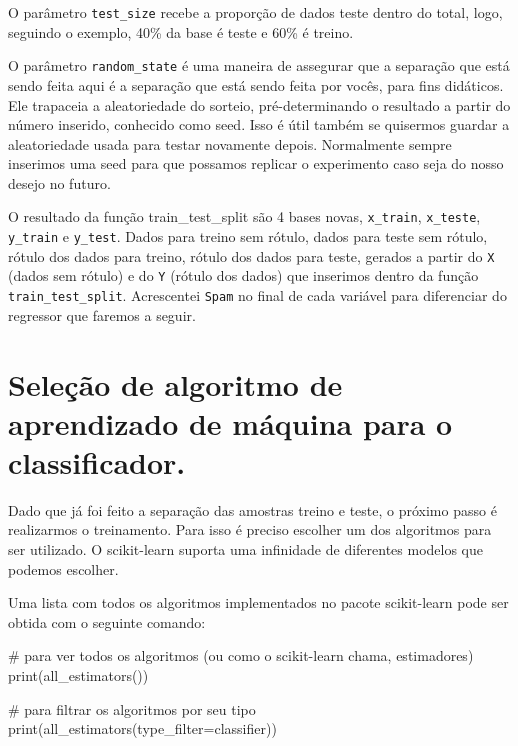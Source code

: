\documentclass[
  letterpaper,
  DIV=11,
  numbers=noendperiod]{scrreprt}
\newenvironment{Shaded}{\begin{snugshade}}{\end{snugshade}}
\newcommand{\BuiltInTok}[1]{\textcolor[rgb]{0.00,0.23,0.31}{#1}}
\newcommand{\CommentTok}[1]{\textcolor[rgb]{0.37,0.37,0.37}{#1}}
\newcommand{\NormalTok}[1]{\textcolor[rgb]{0.00,0.23,0.31}{#1}}
\newcommand{\OperatorTok}[1]{\textcolor[rgb]{0.37,0.37,0.37}{#1}}
\newcommand{\StringTok}[1]{\textcolor[rgb]{0.13,0.47,0.30}{#1}}
\begin{document}
O parâmetro \texttt{test\_size} recebe a proporção de dados teste dentro
do total, logo, seguindo o exemplo, 40\% da base é teste e 60\% é
treino.

O parâmetro \texttt{random\_state} é uma maneira de assegurar que a
separação que está sendo feita aqui é a separação que está sendo feita
por vocês, para fins didáticos. Ele trapaceia a aleatoriedade do
sorteio, pré-determinando o resultado a partir do número inserido,
conhecido como seed. Isso é útil também se quisermos guardar a
aleatoriedade usada para testar novamente depois. Normalmente sempre
inserimos uma seed para que possamos replicar o experimento caso seja do
nosso desejo no futuro.

O resultado da função train\_test\_split são 4 bases novas,
\texttt{x\_train}, \texttt{x\_teste}, \texttt{y\_train} e
\texttt{y\_test}. Dados para treino sem rótulo, dados para teste sem
rótulo, rótulo dos dados para treino, rótulo dos dados para teste,
gerados a partir do \texttt{X} (dados sem rótulo) e do \texttt{Y}
(rótulo dos dados) que inserimos dentro da função
\texttt{train\_test\_split}. Acrescentei \texttt{Spam} no final de cada
variável para diferenciar do regressor que faremos a seguir.

\hypertarget{seleuxe7uxe3o-de-algoritmo-de-aprendizado-de-muxe1quina-para-o-classificador.}{%
\section{Seleção de algoritmo de aprendizado de máquina para o
classificador.}\label{seleuxe7uxe3o-de-algoritmo-de-aprendizado-de-muxe1quina-para-o-classificador.}}

Dado que já foi feito a separação das amostras treino e teste, o próximo
passo é realizarmos o treinamento. Para isso é preciso escolher um dos
algoritmos para ser utilizado. O scikit-learn suporta uma infinidade de
diferentes modelos que podemos escolher.

Uma lista com todos os algoritmos implementados no pacote scikit-learn
pode ser obtida com o seguinte comando:

\begin{Shaded}
\begin{Highlighting}[]
\CommentTok{\# para ver todos os algoritmos (ou como o scikit{-}learn chama, estimadores)}
\BuiltInTok{print}\NormalTok{(all\_estimators())}

\CommentTok{\# para filtrar os algoritmos por seu tipo }
\BuiltInTok{print}\NormalTok{(all\_estimators(type\_filter}\OperatorTok{=}\StringTok{\textquotesingle{}classifier\textquotesingle{}}\NormalTok{)) }
\end{Highlighting}
\end{Shaded}
\end{document}
